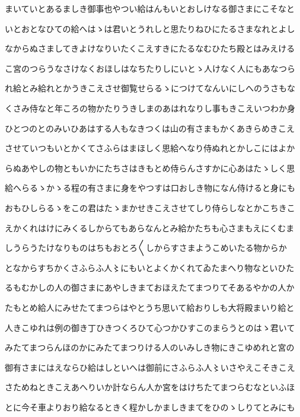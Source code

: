 \documentclass[a4paper,11pt,landscape]{ltjtarticle}
\begin{document}
\par\medskip
まいていとあるましき御事也やつい給はんもいとおしけなる御さまにこそなと
\par\medskip
いとおとなひての給へはゝは君いとうれしと思たりねひにたるさまなれとよし
\par\medskip
なからぬさましてきよけなりいたくこえすきにたるなむひたち殿とはみえける
\par\medskip
こ宮のつらうなさけなくおほしはなちたりしにいとゝ人けなく人にもあなつら
\par\medskip
れ給とみ給れとかうきこえさせ御覧せらるゝにつけてなんいにしへのうさもな
\par\medskip
くさみ侍なと年ころの物かたりうきしまのあはれなりし事もきこえいつわか身
\par\medskip
ひとつのとのみいひあはする人もなきつくは山の有さまもかくあきらめきこえ
\par\medskip
させていつもいとかくてさふらはまほしく思給へなり侍ぬれとかしこにはよか
\par\medskip
らぬあやしの物ともいかにたちさはきもとめ侍らんさすかに心あはたゝしく思
\par\medskip
給へらるゝかゝる程の有さまに身をやつすは口おしき物になん侍けると身にも
\par\medskip
おもひしらるゝをこの君はたゝまかせきこえさせてしり侍らしなとかこちきこ
\par\medskip
えかくれはけにみくるしからてもあらなんとみ給かたちも心さまもえにくむま
\par\medskip
しうらうたけなりものはちもおとろ〱しからすさまようこめいたる物からか
\par\medskip
となからすちかくさふらふ人〻にもいとよくかくれてゐたまへり物なといひた
\par\medskip
るもむかしの人の御さまにあやしきまておほえたてまつりてそあるやかの人か
\par\medskip
たもとめ給人にみせたてまつらはやとうち思いて給おりしも大将殿まいり給と
\par\medskip
人きこゆれは例の御き丁ひきつくろひて心つかひすこのまらうとのはゝ君いて
\par\medskip
みたてまつらんほのかにみたてまつりける人のいみしき物にきこゆめれと宮の
\par\medskip
御有さまにはえならひ給はしといへは御前にさふらふ人〻いさやえこそきこえ
\par\medskip
さためねときこえあへりいか計ならん人か宮をはけちたてまつらむなといふほ
\par\medskip
とに今そ車よりおり給なるときく程かしかましきまてをひのゝしりてとみにも
\end{document}
